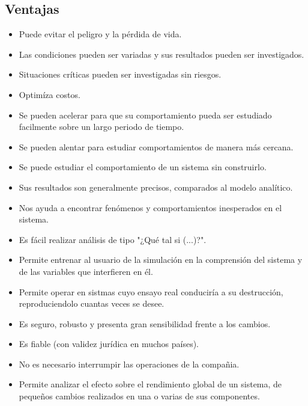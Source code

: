 \documentclass[letterpaper, 12pt]{article}
\begin{document}
    \newpage
    \begin{justify}
        \setcounter{page}{1}
        \thispagestyle{fancy}
        \section*{Ventajas}
        \justify
        \begin{itemize}
            \item Puede evitar el peligro y la pérdida de vida.
            \item Las condiciones pueden ser variadas y sus resultados pueden ser investigados.
            \item Situaciones críticas pueden ser investigadas sin riesgos.
            \item Optimíza costos.
            \item Se pueden acelerar para que su comportamiento pueda ser estudiado facilmente sobre un largo periodo de tiempo.
            \item Se pueden alentar para estudiar comportamientos de manera más cercana.
            \item Se puede estudiar el comportamiento de un sistema sin construirlo.
            \item Sus resultados son generalmente precisos, comparados al modelo analítico.
            \item Nos ayuda a encontrar fenómenos y comportamientos inesperados en el sistema.
            \item Es fácil realizar análisis de tipo "¿Qué tal si (...)?".
            \item Permite entrenar al usuario de la simulación en la comprensión del sistema y de las variables que interfieren en él.
            \item Permite operar en sistmas cuyo ensayo real conduciría a su destrucción, reproduciendolo cuantas veces se desee.
            \item Es seguro, robusto y presenta gran sensibilidad frente a los cambios.
            \item Es fiable (con validez jurídica en muchos países).
            \item No es necesario interrumpir las operaciones de la compañia.
            \item Permite analizar el efecto sobre el rendimiento global de un sistema, de pequeños cambios realizados en una o varias de sus componentes.
        \end{itemize}

\end{justify}
\end{document}
